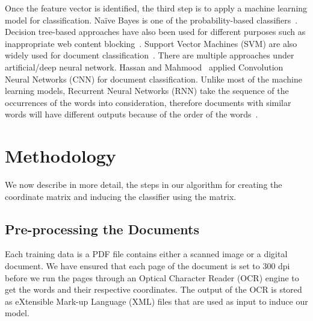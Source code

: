 Once the feature vector is identified, the third step is to apply a machine learning model for classification. Na\"ive Bayes is one of the probability-based classifiers~\cite{kotenko2015}. Decision tree-based approaches have also been used for different purposes such as inappropriate web content blocking~\cite{liu2017}. Support Vector Machines (SVM) are also widely used for document classification~\cite{farhoodi2010,lin2006}. There are multiple approaches under artificial/deep neural network. Hassan and Mahmood~\cite{hassan2017} applied Convolution Neural Networks (CNN) for document classification. Unlike most of the machine learning models, Recurrent Neural Networks (RNN) take the sequence of the occurrences of the words into consideration, therefore documents with similar words will have different outputs because of the order of the words~\cite{banerjee2019,kumar2019}.

\section{Methodology}\label{algo}
We now describe in more detail, the steps in our algorithm for creating the coordinate matrix and inducing the classifier using the matrix.

\subsection{Pre-processing the Documents}
Each training data is a PDF file contains either a scanned image or a digital document. We have ensured that each page of the document is set to 300 dpi before we run the pages through an Optical Character Reader (OCR) engine to get the words and their respective coordinates. The output of the OCR is stored as eXtensible Mark-up Language (XML) files that are used as input to induce our model.

